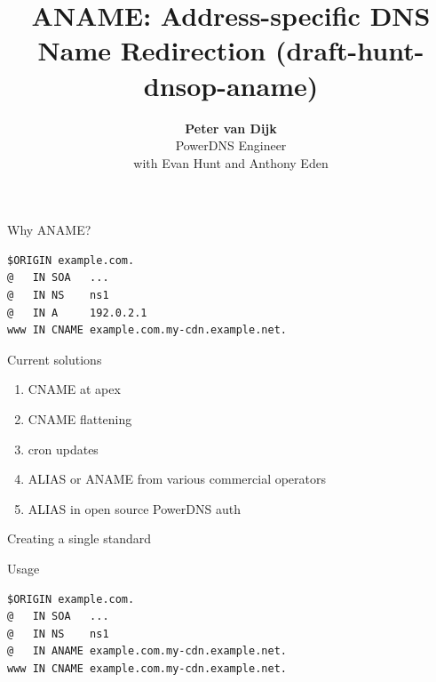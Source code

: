 \documentclass{beamer}
\title[aname]{ANAME: Address-specific DNS Name Redirection (draft-hunt-dnsop-aname)}
\author{\textbf{Peter van Dijk}\\PowerDNS Engineer\\with Evan Hunt and Anthony Eden}
\date{}
\begin{document}
\begin{frame}
  \titlepage
\end{frame}

\begin{frame}[fragile]{Why ANAME?}
  \begin{verbatim}
$ORIGIN example.com.
@   IN SOA   ...
@   IN NS    ns1
@   IN A     192.0.2.1
www IN CNAME example.com.my-cdn.example.net.
  \end{verbatim}
\end{frame}

\begin{frame}{Current solutions}
  \begin{enumerate}
    \item CNAME at apex
    \item CNAME flattening
    \item cron updates
    \item ALIAS or ANAME from various commercial operators
    \item ALIAS in open source PowerDNS auth
  \end{enumerate}
\end{frame}

\begin{frame}{Creating a single standard}
\end{frame}

\begin{frame}[fragile]{Usage}
  \begin{verbatim}
$ORIGIN example.com.
@   IN SOA   ...
@   IN NS    ns1
@   IN ANAME example.com.my-cdn.example.net.
www IN CNAME example.com.my-cdn.example.net.
  \end{verbatim}
\end{frame}
\end{document}
